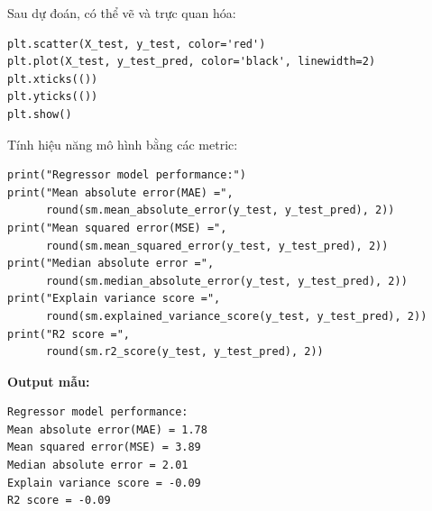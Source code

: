 \begin{vidu}[title={Bước 5: Vẽ đồ thị}]
Sau dự đoán, có thể vẽ và trực quan hóa:

\begin{lstlisting}
plt.scatter(X_test, y_test, color='red')
plt.plot(X_test, y_test_pred, color='black', linewidth=2)
plt.xticks(())
plt.yticks(())
plt.show()
\end{lstlisting}
\end{vidu}

\begin{vidu}[title={Bước 6: Tính hiệu năng}]
Tính hiệu năng mô hình bằng các metric:

\begin{lstlisting}
print("Regressor model performance:")
print("Mean absolute error(MAE) =",
      round(sm.mean_absolute_error(y_test, y_test_pred), 2))
print("Mean squared error(MSE) =",
      round(sm.mean_squared_error(y_test, y_test_pred), 2))
print("Median absolute error =",
      round(sm.median_absolute_error(y_test, y_test_pred), 2))
print("Explain variance score =",
      round(sm.explained_variance_score(y_test, y_test_pred), 2))
print("R2 score =",
      round(sm.r2_score(y_test, y_test_pred), 2))
\end{lstlisting}

\textbf{Output mẫu:}
\begin{verbatim}
Regressor model performance:
Mean absolute error(MAE) = 1.78
Mean squared error(MSE) = 3.89
Median absolute error = 2.01
Explain variance score = -0.09
R2 score = -0.09
\end{verbatim}
\end{vidu}
